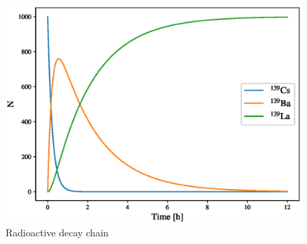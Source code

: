 \begin{figure}[htbp]
    \centering
    \includegraphics[scale=0.8]{ex7/decay.eps}
    \caption{Radioactive decay chain}
    \label{fig:decay_chain}
\end{figure}

